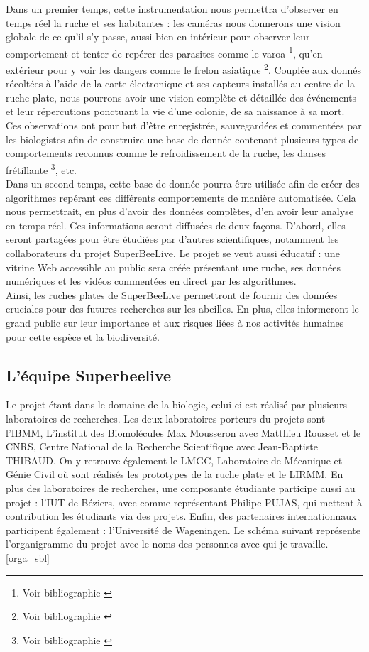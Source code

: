 \documentclass[11pt,french,a4paper]{report}
\begin{document}
{Dans un premier temps, cette instrumentation nous permettra d'observer en temps réel la ruche et ses habitantes : 
les caméras nous donnerons une vision globale de ce qu'il s'y passe, aussi bien en intérieur pour observer leur 
comportement et tenter de repérer des parasites comme le varoa \footnote{Voir bibliographie \cite{ref11}}, 
qu'en extérieur pour y voir les dangers comme le frelon asiatique \footnote{Voir bibliographie \cite{ref12}}.
Couplée aux donnés récoltées à l'aide de la carte électronique et ses capteurs installés au centre de la ruche plate, 
nous pourrons avoir une vision complète et détaillée des événements et leur répercutions ponctuant la vie d'une colonie,
de sa naissance à sa mort. \\
Ces observations ont pour but d'être enregistrée, sauvegardées et commentées par les biologistes afin de construire une base
de donnée contenant plusieurs types de comportements reconnus comme le refroidissement de la ruche, les danses frétillante \footnote{Voir bibliographie \cite{ref10}}, 
etc.  
\\
Dans un second temps, cette base de donnée pourra être utilisée afin de créer des algorithmes repérant ces différents comportements
de manière automatisée. Cela nous permettrait, en plus d'avoir des données complètes, d'en avoir leur analyse en 
temps réel. Ces informations seront diffusées de deux façons. D'abord, elles seront partagées pour être étudiées par d'autres scientifiques, 
notamment les collaborateurs du projet SuperBeeLive. Le projet se veut aussi éducatif : une vitrine Web accessible au public 
sera créée présentant une ruche, ses données numériques et les vidéos commentées en direct par les algorithmes. \\


Ainsi, les ruches plates de SuperBeeLive permettront de fournir des données cruciales pour des futures recherches sur les 
abeilles. En plus, elles informeront le grand public sur leur importance et aux risques liées à nos activités humaines pour 
cette espèce et la biodiversité. 


\subsection{L'équipe Superbeelive}
Le projet étant dans le domaine de la biologie, celui-ci est réalisé par plusieurs laboratoires de recherches. 
Les deux laboratoires porteurs du projets sont l'IBMM, L'institut des Biomolécules Max Mousseron avec Matthieu Rousset
et le CNRS, Centre National de la Recherche Scientifique avec Jean-Baptiste THIBAUD. On y retrouve également le LMGC, Laboratoire
de Mécanique et Génie Civil où sont réalisés les prototypes de la ruche plate et le LIRMM. 
En plus des laboratoires de recherches, une composante étudiante participe aussi au projet : l'IUT de Béziers, avec comme représentant
Philipe PUJAS, qui mettent à contribution les étudiants via des projets. Enfin, des partenaires internationnaux participent également :
l'Université de Wageningen. 
Le schéma suivant représente l'organigramme du projet avec le noms des personnes avec qui je travaille. \ref{orga_sbl}

}
\end{document}
